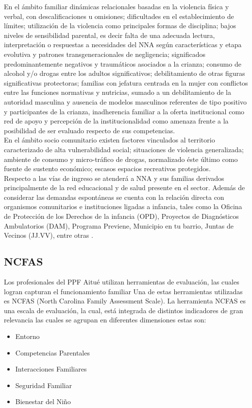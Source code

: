 En el ámbito familiar dinámicas relacionales basadas en la violencia física y verbal, con descalificaciones u omisiones; dificultades en el establecimiento de límites; utilización de la violencia como principales formas de disciplina; bajos niveles de sensibilidad parental, es decir falta de una adecuada lectura, interpretación o respuestas a necesidades del NNA según características y etapa evolutiva y patrones transgeneracionales de negligencia; significados predominantemente negativos y traumáticos asociados a la crianza; consumo de alcohol y/o drogas entre los adultos significativos; debilitamiento de otras figuras significativas protectoras; familias con jefatura centrada en la mujer con conflictos entre las funciones normativas y nutricias, sumado a un debilitamiento de la autoridad masculina y ausencia de modelos masculinos referentes de tipo positivo y participantes de la crianza, inadherencia familiar a la oferta institucional como red de apoyo y percepción de la institucionalidad como amenaza frente a la posibilidad de ser evaluado respecto de sus competencias.\\

En el ámbito socio comunitario existen factores vinculados al territorio caracterizado de alta vulnerabilidad social; situaciones de violencia generalizada; ambiente de consumo y micro-tráfico de drogas, normalizado éste último como fuente de sustento económico; escasos espacios recreativos protegidos.\\

Respecto a las vías de ingreso se atenderá a NNA y sus familias derivados principalmente de la red educacional y de salud presente en el sector. Además de considerar las demandas espontáneas se cuenta con la relación directa con organismos comunitarios e instituciones ligadas a infancia, tales como la Oficina de Protección de los Derechos de la infancia (OPD), Proyectos de Diagnósticos Ambulatorios (DAM), Programa Previene, Municipio en tu barrio, Juntas de Vecinos (JJ.VV), entre otras \cite{REF3}.\\


\subsection{NCFAS}
\vspace{2mm}
\normalsize

Los profesionales del PPF Aitué utilizan herramientas de evaluación, las cuales logran capturan  el funcionamiento familiar 
Una de estas herramientas utilizadas es NCFAS (North Carolina Family Assessment Scale). La herramienta NCFAS es una escala de evaluación, la cual, está integrada de distintos indicadores de gran relevancia las cuales se agrupan en diferentes dimensiones estas son:
\begin{itemize}
	\item Entorno
	\item Competencias Parentales
	\item Interacciones Familiares
	\item Seguridad Familiar
	\item Bienestar del Niño 
\end{itemize}

